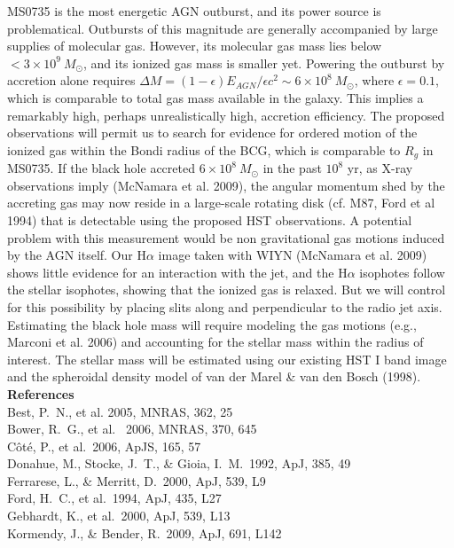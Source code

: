 \documentclass[12pt]{article}
\begin{document}
MS0735 is the most energetic AGN
outburst, and its power source is problematical.  Outbursts of this magnitude are generally accompanied by
large supplies of molecular gas.  However, its molecular gas mass lies below $<3\times 10^9~ M_\odot$, and its ionized
gas mass is smaller yet.  Powering
the outburst by accretion alone requires $\Delta M =(1-\epsilon)E_{AGN}/\epsilon c^2\sim 6\times 10^8~ M_\odot$, where
$\epsilon =0.1$, which is comparable to total gas mass available in the galaxy.  This implies a remarkably 
high, perhaps unrealistically high, accretion efficiency.   The
proposed observations will permit us to search for evidence for ordered motion of the ionized gas within the Bondi radius of
the BCG, which is comparable to $R_g$ in MS0735. If the black hole accreted   $6\times 10^8~ M_\odot$ in
the past $10^8$ yr, as X-ray observations imply (McNamara et al. 2009), the angular momentum shed by the accreting gas may now reside in 
a large-scale rotating disk (cf. M87, Ford et al 1994) that is detectable using the proposed HST observations. 
A potential problem with this measurement would be non gravitational gas motions induced by the AGN itself.  Our H$\alpha$ image taken with WIYN (McNamara et al. 2009) shows little evidence
for an interaction with the jet, and the H$\alpha$ isophotes follow the stellar isophotes, showing that the 
ionized gas is relaxed.   But we will control for this possibility by placing slits along and perpendicular to
the radio jet axis.  Estimating the black hole mass will require modeling the gas motions (e.g., Marconi et al. 2006) and accounting for the stellar
mass within the radius of interest.  The stellar mass will be estimated using our existing HST I band image and 
the spheroidal density model of van der Marel \& van den Bosch (1998). 
\noindent
{\bf References}\\
\noindent 
Best, P.~N., et al.  2005, MNRAS, 362, 25\\
Bower, R.~G., et al. \ 2006, MNRAS, 370, 645 \\
C{\^o}t{\'e}, P., et al.\ 2006, ApJS, 165, 57 \\
Donahue, M., Stocke, J.~T., \& Gioia, I.~M.\ 1992, ApJ, 385, 49 \\
Ferrarese, L., \& Merritt, D.\ 2000, ApJ, 539, L9 \\
Ford, H.~C., et al.\ 1994, ApJ, 435, L27 \\
Gebhardt, K., et al.\ 2000, ApJ, 539, L13 \\
Kormendy, J., \& Bender, R.\ 2009, ApJ, 691, L142 \\
\end{document}

